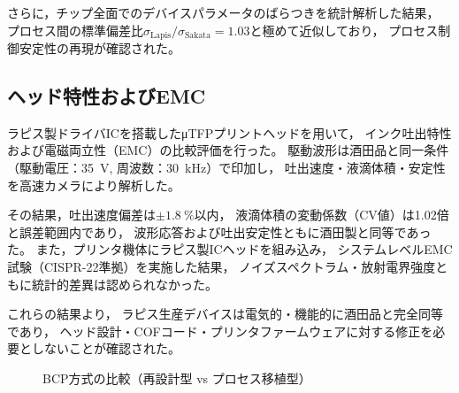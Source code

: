 \documentclass[conference]{IEEEtran}
\begin{document}
さらに，チップ全面でのデバイスパラメータのばらつきを統計解析した結果，
プロセス間の標準偏差比$\sigma_{\mathrm{Lapis}} / \sigma_{\mathrm{Sakata}} = 1.03$と極めて近似しており，
プロセス制御安定性の再現が確認された。

\subsection{ヘッド特性およびEMC}
ラピス製ドライバICを搭載したμTFPプリントヘッドを用いて，
インク吐出特性および電磁両立性（EMC）の比較評価を行った。
駆動波形は酒田品と同一条件（駆動電圧：\SI{35}{\volt}, 周波数：\SI{30}{\kilo\hertz}）で印加し，
吐出速度・液滴体積・安定性を高速カメラにより解析した。

その結果，吐出速度偏差は$\pm\SI{1.8}{\percent}$以内，
液滴体積の変動係数（CV値）は1.02倍と誤差範囲内であり，
波形応答および吐出安定性ともに酒田製と同等であった。
また，プリンタ機体にラピス製ICヘッドを組み込み，
システムレベルEMC試験（CISPR-22準拠）を実施した結果，
ノイズスペクトラム・放射電界強度ともに統計的差異は認められなかった。

これらの結果より，
ラピス生産デバイスは電気的・機能的に酒田品と完全同等であり，
ヘッド設計・COFコード・プリンタファームウェアに対する修正を必要としないことが確認された。

\begin{figure}[t]
\centering
{}
\caption{BCP方式の比較（再設計型 vs プロセス移植型）}
\label{fig:bcp_compare}
\end{figure}
\end{document}
